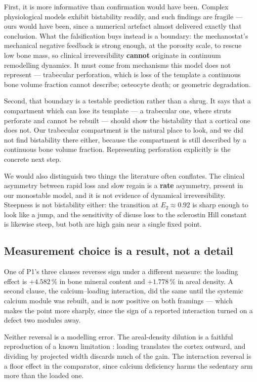 \documentclass[10pt,letterpaper]{article}
\begin{document}
First, it is more informative than confirmation would have been. Complex
physiological models exhibit bistability readily, and such findings are
fragile --- ours would have been, since a numerical artefact almost delivered
exactly that conclusion. What the falsification buys instead is a boundary:
the mechanostat's mechanical negative feedback is strong enough, at the
porosity scale, to rescue low bone mass, so clinical irreversibility
\textbf{cannot} originate in continuum remodelling dynamics. It must come from
mechanisms this model does not represent --- trabecular perforation, which is
loss of the template a continuous bone volume fraction cannot describe;
osteocyte death; or geometric degradation.

Second, that boundary is a testable prediction rather than a shrug. It says
that a compartment which can lose its template --- a trabecular one, where
struts perforate and cannot be rebuilt --- should show the bistability that a
cortical one does not. Our trabecular compartment is the natural place to
look, and we did not find bistability there either, because the compartment is
still described by a continuous bone volume fraction. Representing perforation
explicitly is the concrete next step.

We would also distinguish two things the literature often conflates. The
clinical asymmetry between rapid loss and slow regain is a \textbf{rate}
asymmetry, present in our monostable model, and it is not evidence of
dynamical irreversibility. Steepness is not bistability either: the transition
at $E_2 \approx 0.92$ is sharp enough to look like a jump, and the sensitivity
of disuse loss to the sclerostin Hill constant is likewise steep, but both are
high gain near a single fixed point.

\subsection*{Measurement choice is a result, not a detail}

One of P1's three clauses reverses sign under a different measure: the loading
effect is $+4.582\,\%$ in bone mineral content and $+1.778\,\%$ in areal
density. A second clause, the calcium--loading interaction, did the same until
the systemic calcium module was rebuilt, and is now positive on both framings
--- which makes the point more sharply, since the sign of a reported
interaction turned on a defect two modules away.

Neither reversal is a modelling error. The areal-density dilution is a
faithful reproduction of a known limitation \cite{haapasalo2000}: loading
translates the cortex outward, and dividing by projected width discards much
of the gain. The interaction reversal is a floor effect in the comparator,
since calcium deficiency harms the sedentary arm more than the loaded one.
\end{document}
